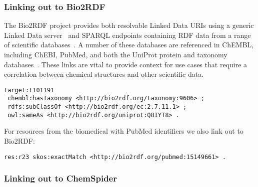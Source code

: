 \documentclass[10pt]{bmc_article}
\newenvironment{bmcformat}{\begin{raggedright}\baselineskip20pt\sloppy\setboolean{publ}{false}}{\end{raggedright}\baselineskip20pt\sloppy}
\begin{document}
\begin{bmcformat}
\subsubsection*{Linking out to Bio2RDF}

The Bio2RDF project provides both resolvable Linked Data URIs using a generic Linked Data
server~\cite{Ansell2011} and SPARQL endpoints containing RDF data from a range of scientific databases~\cite{Belleau2008}.
A number of these databases are referenced in ChEMBL, including ChEBI, PubMed, and both the
UniProt protein and taxonomy databases~\cite{TheUniProtConsortium2010}. These links are
vital to provide context for use cases that require a correlation between chemical
structures and other scientific data. 

%
%

\begin{small}
\begin{verbatim}
target:t101191
 chembl:hasTaxonomy <http://bio2rdf.org/taxonomy:9606> ;
 rdfs:subClassOf <http://bio2rdf.org/ec:2.7.11.1> ;
 owl:sameAs <http://bio2rdf.org/uniprot:Q8IYT8> .
\end{verbatim}
\end{small}

For resources from the biomedical with PubMed identifiers we also link out to Bio2RDF:

\begin{small}
\begin{verbatim}
res:r23 skos:exactMatch <http://bio2rdf.org/pubmed:15149661> .
\end{verbatim}
\end{small}

\subsubsection*{Linking out to ChemSpider}


\end{bmcformat}
\end{document}
